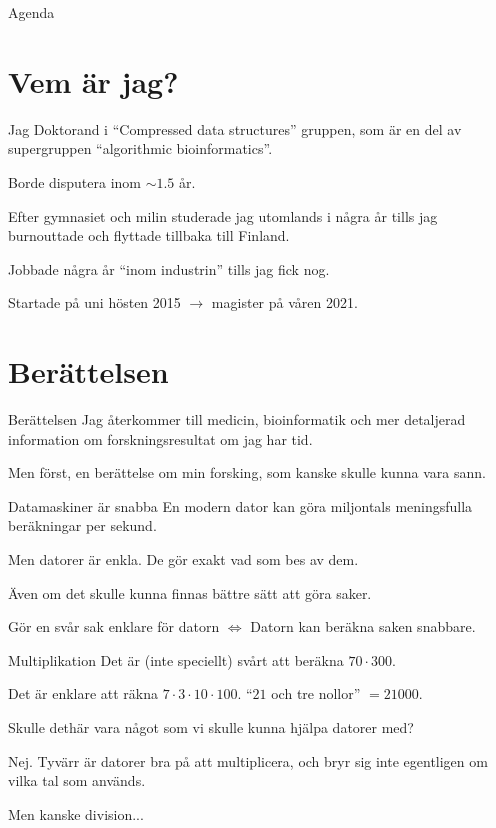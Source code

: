 \documentclass[11pt, aspectratio=169, table]{beamer}
\begin{document}

\begin{frame}{Agenda}
\setlength\parskip{\fill}
\tableofcontents
\end{frame}

\section{Vem är jag?}
\begin{frame}{Jag}
\setlength{\parskip}{\fill}
Doktorand i ``Compressed data structures'' gruppen, som är en del av supergruppen ``algorithmic bioinformatics''.

Borde disputera inom $\sim 1.5$ år.

Efter gymnasiet och milin studerade jag utomlands i några år tills jag burnouttade och flyttade tillbaka till Finland.

Jobbade några år ``inom industrin'' tills jag fick nog.

Startade på uni hösten 2015 $\to$ magister på våren 2021.
\end{frame}

\section{Berättelsen}
\begin{frame}{Berättelsen}
\setlength{\parskip}{\fill}
Jag återkommer till medicin, bioinformatik och mer detaljerad information om forskningsresultat om jag har tid.

Men först, en berättelse om min forsking, som kanske skulle kunna vara sann.
\end{frame}

\begin{frame}{Datamaskiner är snabba}
\setlength{\parskip}{\fill}
En modern dator kan göra miljontals meningsfulla beräkningar per sekund.

Men datorer är enkla. De gör \alert{exakt} vad som bes av dem. 

Även om det skulle kunna finnas bättre sätt att göra saker.

Gör en svår sak enklare för datorn $\Leftrightarrow$ Datorn kan beräkna saken snabbare.
\end{frame}

\begin{frame}{Multiplikation}
\setlength{\parskip}{\fill}
Det är (inte speciellt) svårt att beräkna $70 \cdot 300$.

Det är enklare att räkna $7 \cdot 3 \cdot 10 \cdot 100$. ``$21$ och tre nollor'' $= 21000$.

Skulle dethär vara något som vi skulle kunna hjälpa datorer med?

\pause
Nej. Tyvärr är datorer bra på att multiplicera, och bryr sig inte egentligen om vilka tal som används.

\pause
Men kanske division...
\end{frame}
\end{document}
